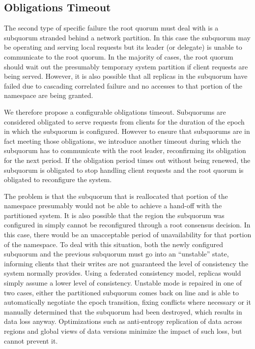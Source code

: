 \subsection{Obligations Timeout}
\label{ch03_obligations_timeout}

The second type of specific failure the root quorum must deal with is a subquorum stranded behind a network partition.
In this case the subquorum may be operating and serving local requests but its leader (or delegate) is unable to communicate to the root quorum.
In the majority of cases, the root quorum should wait out the presumably temporary system partition if client requests are being served.
However, it is also possible that all replicas in the subquorum have failed due to cascading correlated failure and no accesses to that portion of the namespace are being granted.

We therefore propose a configurable obligations timeout.
Subquorums are considered obligated to serve requests from clients for the duration of the epoch in which the subquorum is configured.
However to ensure that subquorums are in fact meeting those obligations, we introduce another timeout during which the subquorum has to communicate with the root leader, reconfirming its obligation for the next period.
If the obligation period times out without being renewed, the subquorum is obligated to stop handling client requests and the root quorum is obligated to reconfigure the system.

The problem is that the subquorum that is reallocated that portion of the namespace presumably would not be able to achieve a hand-off with the partitioned system.
It is also possible that the region the subquorum was configured in simply cannot be reconfigured through a root consensus decision.
In this case, there would be an unacceptable period of unavailability for that portion of the namespace.
To deal with this situation, both the newly configured subquorum and the previous subquorum must go into an ``unstable'' state, informing clients that their writes are not guaranteed the level of consistency the system normally provides.
Using a federated consistency model, replicas would simply assume a lower level of consistency.
Unstable mode is repaired in one of two cases, either the partitioned subquorum comes back on line and is able to automatically negotiate the epoch transition, fixing conflicts where necessary or it manually determined that the subquorum had been destroyed, which results in data loss anyway.
Optimizations such as anti-entropy replication of data across regions and global views of data versions minimize the impact of such loss, but cannot prevent it.

